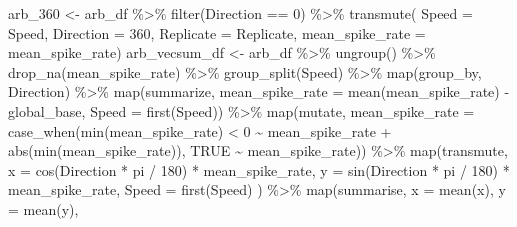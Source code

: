 \documentclass[
]{book}
\newenvironment{Shaded}{\begin{snugshade}}{\end{snugshade}}
\newcommand{\AttributeTok}[1]{\textcolor[rgb]{0.77,0.63,0.00}{#1}}
\newcommand{\ConstantTok}[1]{\textcolor[rgb]{0.00,0.00,0.00}{#1}}
\newcommand{\DecValTok}[1]{\textcolor[rgb]{0.00,0.00,0.81}{#1}}
\newcommand{\FunctionTok}[1]{\textcolor[rgb]{0.00,0.00,0.00}{#1}}
\newcommand{\NormalTok}[1]{#1}
\newcommand{\OtherTok}[1]{\textcolor[rgb]{0.56,0.35,0.01}{#1}}
\newcommand{\SpecialCharTok}[1]{\textcolor[rgb]{0.00,0.00,0.00}{#1}}
\begin{document}
\begin{Shaded}
\begin{Highlighting}[]
\NormalTok{arb\_360 }\OtherTok{\textless{}{-}}
\NormalTok{  arb\_df }\SpecialCharTok{\%\textgreater{}\%}
  \FunctionTok{filter}\NormalTok{(Direction }\SpecialCharTok{==} \DecValTok{0}\NormalTok{) }\SpecialCharTok{\%\textgreater{}\%}
  \FunctionTok{transmute}\NormalTok{(}
    \AttributeTok{Speed =}\NormalTok{ Speed,}
    \AttributeTok{Direction =} \DecValTok{360}\NormalTok{,}
    \AttributeTok{Replicate =}\NormalTok{ Replicate,}
    \AttributeTok{mean\_spike\_rate =}\NormalTok{ mean\_spike\_rate)}
\NormalTok{arb\_vecsum\_df }\OtherTok{\textless{}{-}}
\NormalTok{  arb\_df }\SpecialCharTok{\%\textgreater{}\%}
  \FunctionTok{ungroup}\NormalTok{() }\SpecialCharTok{\%\textgreater{}\%}
  \FunctionTok{drop\_na}\NormalTok{(mean\_spike\_rate) }\SpecialCharTok{\%\textgreater{}\%}
  \FunctionTok{group\_split}\NormalTok{(Speed) }\SpecialCharTok{\%\textgreater{}\%}
  \FunctionTok{map}\NormalTok{(group\_by, Direction) }\SpecialCharTok{\%\textgreater{}\%}
  \FunctionTok{map}\NormalTok{(summarize,}
      \AttributeTok{mean\_spike\_rate =} \FunctionTok{mean}\NormalTok{(mean\_spike\_rate) }\SpecialCharTok{{-}}\NormalTok{ global\_base,}
      \AttributeTok{Speed =} \FunctionTok{first}\NormalTok{(Speed)) }\SpecialCharTok{\%\textgreater{}\%}
  \FunctionTok{map}\NormalTok{(mutate,}
      \AttributeTok{mean\_spike\_rate =}
        \FunctionTok{case\_when}\NormalTok{(}\FunctionTok{min}\NormalTok{(mean\_spike\_rate) }\SpecialCharTok{\textless{}} \DecValTok{0} \SpecialCharTok{\textasciitilde{}}\NormalTok{ mean\_spike\_rate }\SpecialCharTok{+} \FunctionTok{abs}\NormalTok{(}\FunctionTok{min}\NormalTok{(mean\_spike\_rate)),}
                  \ConstantTok{TRUE} \SpecialCharTok{\textasciitilde{}}\NormalTok{ mean\_spike\_rate)) }\SpecialCharTok{\%\textgreater{}\%}
  \FunctionTok{map}\NormalTok{(transmute,}
      \AttributeTok{x =} \FunctionTok{cos}\NormalTok{(Direction }\SpecialCharTok{*}\NormalTok{ pi }\SpecialCharTok{/} \DecValTok{180}\NormalTok{) }\SpecialCharTok{*}\NormalTok{ mean\_spike\_rate,}
      \AttributeTok{y =} \FunctionTok{sin}\NormalTok{(Direction }\SpecialCharTok{*}\NormalTok{ pi }\SpecialCharTok{/} \DecValTok{180}\NormalTok{) }\SpecialCharTok{*}\NormalTok{ mean\_spike\_rate,}
      \AttributeTok{Speed =} \FunctionTok{first}\NormalTok{(Speed)}
\NormalTok{  ) }\SpecialCharTok{\%\textgreater{}\%}
  \FunctionTok{map}\NormalTok{(summarise,}
      \AttributeTok{x =} \FunctionTok{mean}\NormalTok{(x),}
      \AttributeTok{y =} \FunctionTok{mean}\NormalTok{(y),}

\end{Highlighting}
\end{Shaded}
\end{document}
